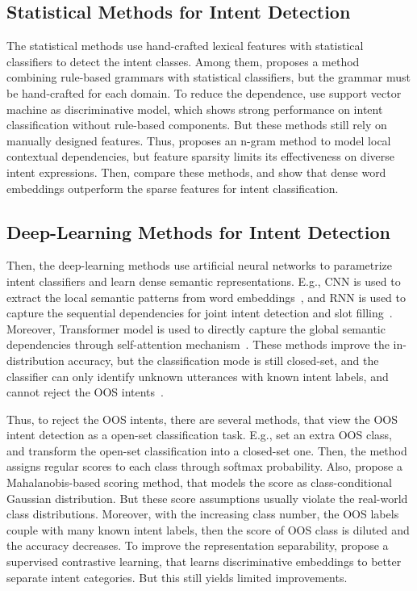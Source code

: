 \documentclass[11pt]{article}
\begin{document}
\subsection{Statistical Methods for Intent Detection}
\label{sec: cascade}
The statistical methods use hand-crafted lexical features with statistical classifiers to detect the intent classes. Among them, \citet{wang2002combination} proposes a method combining rule-based grammars with statistical classifiers, but the grammar must be hand-crafted for each domain. To reduce the dependence, \citet{haffner2003optimizing} use support vector machine as discriminative model, which shows strong performance on intent classification without rule-based components. But these methods still rely on manually designed features. Thus, \citet{tur2010what} proposes an n-gram method to model local contextual dependencies, but feature sparsity limits its effectiveness on diverse intent expressions. Then, \citet{schuurmans2020intent} compare these methods, and show that dense word embeddings outperform the sparse features for intent classification.

\subsection{Deep-Learning Methods for Intent Detection}
Then, the deep-learning methods use artificial neural networks to parametrize intent classifiers and learn dense semantic representations. E.g., CNN is used to extract the local semantic patterns from word embeddings~\citep{kim2014convolutional}, and RNN is used to capture the sequential dependencies for joint intent detection and slot filling~\citep{liu2016attention}. Moreover, Transformer model is used to directly capture the global semantic dependencies through self-attention mechanism~\citep{vaswani2017attention}. These methods improve the in-distribution accuracy, but the classification mode is still closed-set, and the classifier can only identify unknown utterances with known intent labels, and cannot reject the OOS intents~\citep{hendrycks2017baseline, guo2017calibration}. 

Thus, to reject the OOS intents, there are several methods, that view the OOS intent detection as a open-set classification task. E.g., \citet{hendrycks2017baseline} set an extra OOS class, and transform the open-set classification into a closed-set one. Then, the method assigns regular scores to each class through softmax probability. Also, \citet{lee2018simple} propose a Mahalanobis-based scoring method, that models the score as class-conditional Gaussian distribution. But these score assumptions usually violate the real-world class distributions. Moreover, with the increasing class number, the OOS labels couple with many known intent labels, then the score of OOS class is diluted and the accuracy decreases. To improve the representation separability, \citet{zeng2021modeling} propose a supervised contrastive learning, that learns discriminative embeddings to better separate intent categories. But this still yields limited improvements. 
\end{document}
